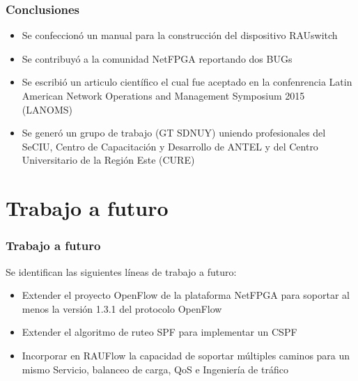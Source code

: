 \documentclass{beamer}
\begin{document}
\begin{frame}
\frametitle{Conclusiones} 

\begin{itemize}[<+->]
\item Se confeccion\'o un manual para la construcci\'on del dispositivo RAUswitch

\item Se contribuy\'o a la comunidad NetFPGA reportando dos BUGs

\item Se escribió un articulo cient\'ifico el cual fue aceptado en la confenrencia Latin American Network Operations and Management Symposium 2015 (LANOMS)

\item Se gener\'o un grupo de trabajo (GT SDNUY) uniendo profesionales del SeCIU, Centro de Capacitación y Desarrollo de ANTEL y del Centro Universitario de la Región Este (CURE) 

\end{itemize}

\end{frame}



\section{Trabajo a futuro} 
\frame{\tableofcontents[currentsection]}

\begin{frame}
\frametitle{Trabajo a futuro} 

Se identifican las siguientes l\'ineas de trabajo a futuro:
\pause

\begin{itemize}[<+->]

\item Extender el proyecto OpenFlow de la plataforma NetFPGA para soportar al menos la versi\'on 1.3.1 del protocolo OpenFlow

\item Extender el algoritmo de ruteo SPF para implementar un CSPF

\item Incorporar en RAUFlow la capacidad de soportar m\'ultiples caminos para un mismo Servicio,  balanceo de carga, QoS e Ingenier\'ia de tr\'afico

\end{itemize}

\end{frame}
\end{document}
